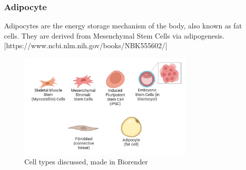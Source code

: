 \subsubsection*{Adipocyte}
Adipocytes are the energy storage mechanism of the body, also known as fat cells. They are derived from Mesenchymal Stem Cells via adipogenesis. [https://www.ncbi.nlm.nih.gov/books/NBK555602/]

\begin{figure}[h]
    \centering
    \includegraphics[width=0.75\textwidth]{will/w2i-cell-types.png}
    \hfill
    \caption{Cell types discussed, made in Biorender}
    \label{fig:cell-types}
\end{figure}

